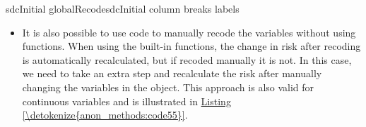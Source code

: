 \documentclass[letterpaper,10pt,english]{sphinxmanual}
\begin{document}
\def\sphinxLiteralBlockLabel{\label{\detokenize{anon_methods:code54}}}
%
\begin{sphinxVerbatim}[commandchars=\\\{\},numbers=left,firstnumber=1,stepnumber=1]
sdcInitial  globalRecodesdcInitial column  
                           breaks     
                           labels  \PYG{l+s}{[0,15)\PYGZsq{}} \PYG{l+s}{[15,65)\PYGZsq{}} \PYG{l+s}{[65,100)\PYGZsq{}}
\end{sphinxVerbatim}
\begin{itemize}
\item {} 
It is also possible to use  code to manually recode the variables
without using  functions. When using the built-in
 functions, the change in risk after recoding is
automatically recalculated, but if recoded manually it is not. In
this case, we need to take an extra step and recalculate the risk
after manually changing the variables in the  object. This
approach is also valid for continuous variables and is illustrated in
\hyperref[\detokenize{anon_methods:code55}]{Listing \ref{\detokenize{anon_methods:code55}}}.

\end{itemize}
\end{document}
